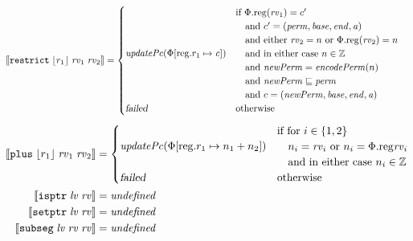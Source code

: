 \documentclass{article}
\newcommand{\update}[2]{[#1 \mapsto #2]}
\newcommand{\sem}[1]{\left\llbracket #1 \right\rrbracket}
\newcommand{\undefined}{\mathit{undefined}}
\newcommand{\var}[1]{\mathit{#1}}
\newcommand{\rv}{\var{rv}}
\newcommand{\lv}{\var{lv}}
\newcommand{\addr}{\var{a}}
\newcommand{\start}{\var{base}}
\newcommand{\addrend}{\var{end}}
\newcommand{\perm}{\var{perm}}
\newcommand{\stdcap}[1][\perm]{\left(#1,\start,\addrend,\addr \right)}
\newcommand{\plainproj}[1]{\mathrm{#1}}
\newcommand{\memreg}[1][\Phi]{#1.\plainproj{reg}}
\newcommand{\updateReg}[3][\Phi]{#1\update{\plainproj{reg}.#2}{#3}}
\newcommand{\failed}{\textsl{failed}}
\newcommand{\plainfun}[2]{
  \ifthenelse{\equal{#2}{}}
             {\mathit{#1}}
             {\mathit{#1}(#2)}
}
\newcommand{\encodePerm}{\plainfun{encodePerm}{}}
\newcommand{\stdUpdatePc}[1]{\plainfun{updatePc}{#1}}
\newcommand{\ints}{\mathbb{Z}}
\newcommand{\refreg}[1]{\lfloor #1 \rfloor}
\newcommand{\zinstr}[1]{\mathtt{#1}}
\newcommand{\twoinstr}[3]{\zinstr{#1} \; #2 \; #3}
\newcommand{\isptr}[2]{\twoinstr{isptr}{#1}{#2}}
\newcommand{\setptr}[2]{\twoinstr{setptr}{#1}{#2}}
\newcommand{\threeinstr}[4]{\zinstr{#1} \; #2 \; #3 \; #4}
\newcommand{\restrict}[3]{\threeinstr{restrict}{#1}{#2}{#3}}
\newcommand{\subseg}[3]{\threeinstr{subseg}{#1}{#2}{#3}}
\newcommand{\plus}[3]{\threeinstr{plus}{#1}{#2}{#3}}
\begin{document}
\begin{align*}
  \sem{\restrict{\refreg{r_1}}{\rv_1}{\rv_2}}           & =
                                             \begin{cases}
                                               \stdUpdatePc{\updateReg{r_1}{\var{c}}}  &
                                                 \arraycolsep=0pt
                                                 \begin{array}{l}
                                                   \text{if $\memreg(\rv_1) = c'$}\\
                                                   \quad\text{and $c' = \stdcap$}\\
                                                   \quad\text{and either $\rv_2 = n$ or $\memreg(\rv_2) = n$}\\
                                                   \quad\text{and in either case $n \in \ints$}\\
                                                   \quad\text{and $\var{newPerm} = \encodePerm(n)$}\\
                                                   \quad\text{and $\var{newPerm} \sqsubseteq \perm$}\\
                                                   \quad\text{and $c = (\var{newPerm},\start,\addrend,\addr)$}
                                                 \end{array}\\
                                               \failed                   & \text{otherwise}
                                             \end{cases} 
\end{align*}
\begin{align*}
  \sem{\plus{\refreg{r_1}}{\rv_1}{\rv_2}}               & =
                                                          \begin{cases}
                                                            \stdUpdatePc{\updateReg{r_1}{n_1+n_2}} &
                                                            \arraycolsep=0pt
                                                            \begin{array}{l}
                                                              \text{if for $i \in \{1,2\}$}\\
                                                              \quad\text{$n_i = \rv_i$ or $n_i = \memreg{\rv_i}$}\\
                                                              \quad\text{and in either case $n_i \in \ints$}
                                                            \end{array}\\
                                                            \failed & \text{otherwise}
                                                          \end{cases}\\
  \sem{\isptr{\lv}{\rv}} & = \undefined \\ 
  \sem{\setptr{\lv}{\rv}} & = \undefined \\ 
  \sem{\subseg{\lv}{\rv}{\rv}} & = \undefined 
\end{align*}
\end{document}
